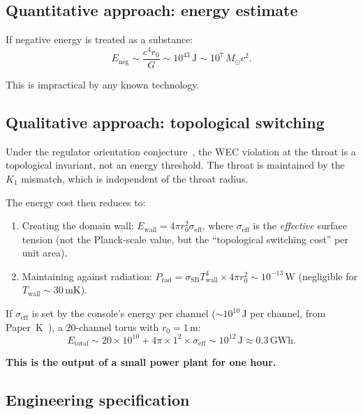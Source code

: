 \documentclass[11pt,a4paper]{article}
\begin{document}
\subsection{Quantitative approach: energy estimate}

If negative energy is treated as a substance:
\begin{equation}
  E_{\mathrm{neg}} \sim \frac{c^4 r_0}{G} \sim 10^{43}\,\mathrm{J}
  \sim 10^7\,M_\odot c^2.
  \label{eq:energy_quant}
\end{equation}

This is impractical by any known technology.

\subsection{Qualitative approach: topological switching}

Under the regulator orientation conjecture~\cite{paper_B}, the
WEC violation at the throat is a topological invariant, not an
energy threshold. The throat is maintained by the $K_1$ mismatch,
which is independent of the throat radius.

The energy cost then reduces to:
\begin{enumerate}
\item Creating the domain wall: $E_{\mathrm{wall}} = 4\pi r_0^2
  \sigma_{\mathrm{eff}}$, where $\sigma_{\mathrm{eff}}$ is the
  \emph{effective} surface tension (not the Planck-scale value,
  but the ``topological switching cost'' per unit area).
\item Maintaining against radiation:
  $P_{\mathrm{rad}} = \sigma_{\mathrm{SB}} T_{\mathrm{wall}}^4
  \times 4\pi r_0^2 \sim 10^{-13}\,\mathrm{W}$ (negligible
  for $T_{\mathrm{wall}} \sim 30\,\mathrm{mK}$).
\end{enumerate}

If $\sigma_{\mathrm{eff}}$ is set by the console's energy per
channel ($\sim 10^{10}\,\mathrm{J}$ per channel, from
Paper~K~\cite{paper_K}), a 20-channel torus with $r_0 = 1\,\mathrm{m}$:
\begin{equation}
  E_{\mathrm{total}} \sim 20 \times 10^{10} + 4\pi \times 1^2
  \times \sigma_{\mathrm{eff}} \sim 10^{12}\,\mathrm{J}
  \approx 0.3\,\mathrm{GWh}.
  \label{eq:energy_qual}
\end{equation}

\textbf{This is the output of a small power plant for one hour.}

\subsection{Engineering specification}
\end{document}
